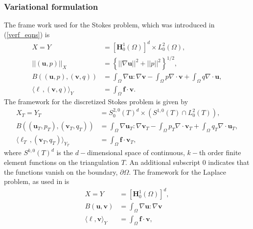 \documentclass[12pt,a4paper]{article}
\theoremstyle{definition}
\begin{document}
\subsubsection{Variational formulation}\label{sec_combi_var_form}
The frame work used for the Stokes problem, which was introduced in (\ref{verf_eqns}) is 
\begin{equation}\label{frame_stokes}
\begin{aligned}
X=Y&=\left[\textbf{H}^1_0\left(\Omega\right)\right]^d\times L^2_0\left(\Omega\right),\\
\left|\left|\left(\textbf{u},p\right)\right|\right|_X&=\left\lbrace \left|\left|\nabla\textbf{u}\right|\right|^2 + \left|\left|p\right|\right|^2\right\rbrace^{1/2},\\
B\left(\left(\textbf{u},p\right),\left(\textbf{v},q\right)\right)&=\int_{\Omega}\nabla \textbf{u} : \nabla \textbf{v} - \int_{\Omega} p \nabla\cdot\textbf{v} + \int_{\Omega} q \nabla\cdot\textbf{u},\\
\langle \ell\,,\left(\textbf{v},q\right) \rangle_Y &= \int_{\Omega}\textbf{f}\cdot \textbf{v}.
\end{aligned}
\end{equation}
The framework for the discretized Stokes problem is given by 
\begin{equation}\label{frame_stokes_disc}
\begin{aligned}
X_T=Y_T&=S_0^{2,0}\left(T\right)^d\times \left(S^{1,0}\left(T\right)\cap L^2_0\left(T\right)\right),\\
B\left(\left(\textbf{u}_T,p_T\right),\left(\textbf{v}_T,q_T\right)\right)&=\int_{\Omega}\nabla \textbf{u}_T : \nabla \textbf{v}_T - \int_{\Omega} p_T \nabla\cdot\textbf{v}_T + \int_{\Omega} q_T \nabla\cdot\textbf{u}_T,\\
\langle \ell_T\,,\left(\textbf{v}_T,q_T\right) \rangle_{Y_T} &= \int_{\Omega}\textbf{f}\cdot \textbf{v}_T,
\end{aligned}
\end{equation}
where $S^{k,0}\left(T\right)^d$ is the $d-$dimensional space of continuous, $k-$th order finite element functions on the triangulation $T$.  An additional subscript $0$ indicates that the functions vanish on the boundary, $\partial \Omega$.
The framework for the Laplace problem, as used in \cite[\S 4.2]{verfurth2013posteriori} is 
\begin{equation}\label{frame_laplace}
\begin{aligned}
X=Y&=\left[\textbf{H}^1_0\left(\Omega\right)\right]^d,\\
B\left(\textbf{u},\textbf{v}\right)&=\int_{\Omega}\nabla \textbf{u} : \nabla \textbf{v}\\
\langle \ell,\textbf{v} \rangle_Y &= \int_{\Omega}\textbf{f}\cdot \textbf{v}, 
\end{aligned}
\end{equation}
\end{document}
